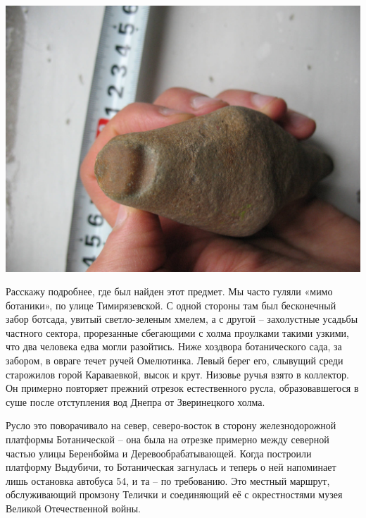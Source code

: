\begin{center}
\includegraphics[width=\linewidth]{chast-colebanie-osnov/nachalo/s_figovina-02.jpg}
\end{center}
\vspace*{\fill}
\newpage


Расскажу подробнее, где был найден этот предмет. Мы часто гуляли «мимо ботаники», по улице Тимирязевской. С одной стороны там был бесконечный забор ботсада, увитый светло-зеленым хмелем, а с другой – захолустные усадьбы частного сектора, прорезанные сбегающими с холма проулками такими узкими, что два человека едва могли разойтись. Ниже хоздвора ботанического сада, за забором, в овраге течет ручей Омелютинка. Левый берег его, слывущий среди старожилов горой Караваевкой, высок и крут. Низовье ручья взято в коллектор. Он примерно повторяет прежний отрезок естественного русла, образовавшегося в суше после отступления вод Днепра от Зверинецкого холма.

Русло это поворачивало на север, северо-восток в сторону железнодорожной платформы Ботанической – она была на отрезке примерно между северной частью улицы Беренбойма и Деревообрабатывающей. Когда построили платформу Выдубичи, то Ботаническая загнулась и теперь о ней напоминает лишь остановка автобуса 54, и та – по требованию. Это местный маршрут, обслуживающий промзону Телички и соединяющий её с окрестностями музея Великой Отечественной войны.

